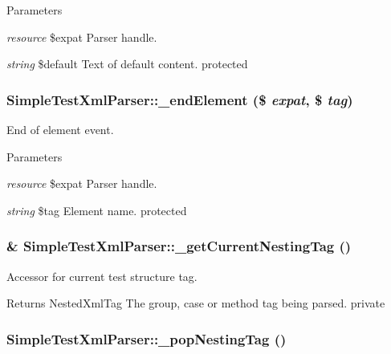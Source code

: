 \begin{DoxyParams}{Parameters}
\item[{\em resource}]\$expat Parser handle. \item[{\em string}]\$default Text of default content.  protected \end{DoxyParams}
\hypertarget{class_simple_test_xml_parser_a19b250a47739a907ebe69a9cd7b0e3bd}{
\subsubsection[{\_\-endElement}]{\setlength{\rightskip}{0pt plus 5cm}SimpleTestXmlParser::\_\-endElement (\$ {\em expat}, \/  \$ {\em tag})}}
\label{class_simple_test_xml_parser_a19b250a47739a907ebe69a9cd7b0e3bd}
End of element event. 
\begin{DoxyParams}{Parameters}
\item[{\em resource}]\$expat Parser handle. \item[{\em string}]\$tag Element name.  protected \end{DoxyParams}
\hypertarget{class_simple_test_xml_parser_a4e33d00bbb8093f93331b6b4f6965947}{
\subsubsection[{\_\-getCurrentNestingTag}]{\setlength{\rightskip}{0pt plus 5cm}\& SimpleTestXmlParser::\_\-getCurrentNestingTag ()}}
\label{class_simple_test_xml_parser_a4e33d00bbb8093f93331b6b4f6965947}
Accessor for current test structure tag. \begin{DoxyReturn}{Returns}
NestedXmlTag The group, case or method tag being parsed.  private 
\end{DoxyReturn}
\hypertarget{class_simple_test_xml_parser_ade10e92d51ae121640bc16aa7d73e581}{
\subsubsection[{\_\-popNestingTag}]{\setlength{\rightskip}{0pt plus 5cm}SimpleTestXmlParser::\_\-popNestingTag ()}}
